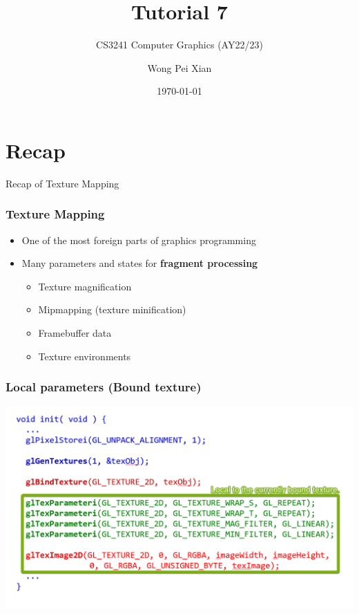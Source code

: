 \documentclass{beamer}
\title{Tutorial 7}
\subtitle{CS3241 Computer Graphics (AY22/23)}
\date{\today}
\author{Wong Pei Xian}
\institute[]{\email{e0389023@u.nus.edu}}
\begin{document}
\frame[plain]{\titlepage}

\section{Recap}

\begin{frame}
    \AlegreyaExtraBold \LARGE
    Recap of Texture Mapping
\end{frame}

\begin{frame}
    \frametitle{Texture Mapping}

    \begin{itemize}
        \item One of the most foreign parts of graphics programming
        \item Many parameters and states for \textbf{fragment processing}
        \begin{itemize}
            \item Texture magnification
            \item Mipmapping (texture minification)
            \item Framebuffer data
            \item Texture environments
        \end{itemize}
    \end{itemize}

\end{frame}

\begin{frame}
    \frametitle{Local parameters (Bound texture)}

    \begin{center}
        \includegraphics[scale=0.5]{local-bound-texture.png}
    \end{center}

\end{frame}
\end{document}
